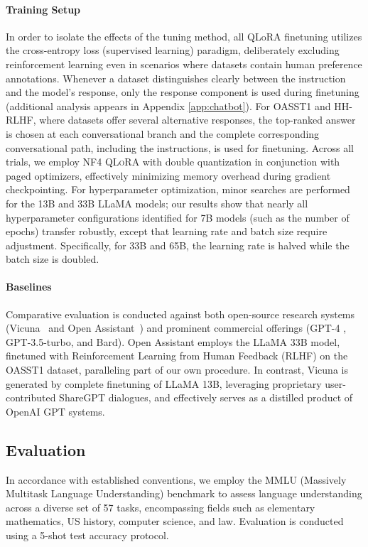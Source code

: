 \paragraph{Training Setup} In order to isolate the effects of the tuning method, all QLoRA finetuning utilizes the cross-entropy loss (supervised learning) paradigm, deliberately excluding reinforcement learning even in scenarios where datasets contain human preference annotations. Whenever a dataset distinguishes clearly between the instruction and the model's response, only the response component is used during finetuning (additional analysis appears in Appendix \ref{app:chatbot}). For OASST1 and HH-RLHF, where datasets offer several alternative responses, the top-ranked answer is chosen at each conversational branch and the complete corresponding conversational path, including the instructions, is used for finetuning. Across all trials, we employ NF4 \textsc{QLoRA} with double quantization in conjunction with paged optimizers, effectively minimizing memory overhead during gradient checkpointing. For hyperparameter optimization, minor searches are performed for the 13B and 33B LLaMA models; our results show that nearly all hyperparameter configurations identified for 7B models (such as the number of epochs) transfer robustly, except that learning rate and batch size require adjustment. Specifically, for 33B and 65B, the learning rate is halved while the batch size is doubled.

\paragraph{Baselines} Comparative evaluation is conducted against both open-source research systems (Vicuna~\citep{vicuna2023} and Open Assistant~\citep{kopf2023openassistant}) and prominent commercial offerings (GPT-4 \citep{openai2023gpt}, GPT-3.5-turbo, and Bard). Open Assistant employs the LLaMA 33B model, finetuned with Reinforcement Learning from Human Feedback (RLHF) on the OASST1 dataset, paralleling part of our own procedure. In contrast, Vicuna is generated by complete finetuning of LLaMA 13B, leveraging proprietary user-contributed ShareGPT dialogues, and effectively serves as a distilled product of OpenAI GPT systems.

\subsection{Evaluation}

In accordance with established conventions, we employ the MMLU (Massively Multitask Language Understanding) benchmark \citep{hendrycksmeasuring} to assess language understanding across a diverse set of 57 tasks, encompassing fields such as elementary mathematics, US history, computer science, and law. Evaluation is conducted using a 5-shot test accuracy protocol.

